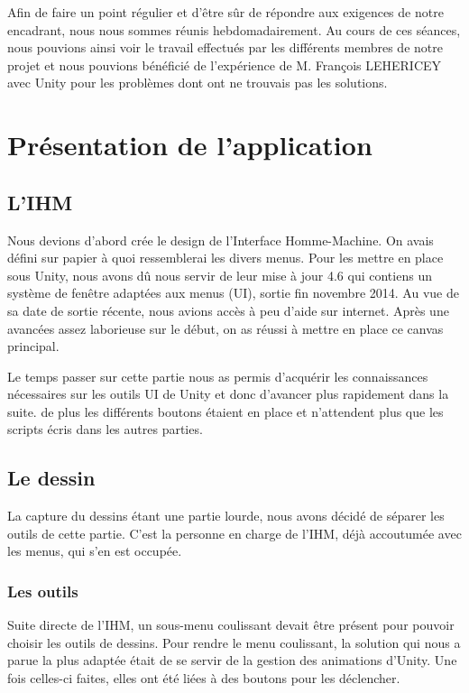 \documentclass[a4paper,11pt]{article}
\begin{document}
	Afin de faire un point régulier et d'être sûr de répondre aux exigences de notre encadrant, nous nous sommes réunis hebdomadairement. Au cours de ces séances, nous pouvions ainsi voir le travail effectués par les différents membres de notre projet et nous pouvions bénéficié de l'expérience de M. François LEHERICEY avec Unity pour les problèmes dont ont ne trouvais pas les solutions.
	\section{Présentation de l'application}
		\subsection{L'IHM}
			Nous devions d'abord crée le design de l'Interface Homme-Machine. On avais défini sur papier à quoi ressemblerai les divers menus. Pour les mettre en place sous Unity, nous avons dû nous servir de leur mise à jour 4.6 qui contiens un système de fenêtre adaptées aux menus (UI), sortie fin novembre 2014. Au vue de sa date de sortie récente, nous avions accès à peu d'aide sur internet. Après une avancées assez laborieuse sur le début, on as réussi à mettre en place ce canvas principal.
			
			Le temps passer sur cette partie nous as permis d'acquérir les connaissances nécessaires sur les outils UI de Unity et donc d'avancer plus rapidement dans la suite. de plus les différents boutons étaient en place et n'attendent plus que les scripts écris dans les autres parties.
		
		\subsection{Le dessin}
			La capture du dessins étant une partie lourde, nous avons décidé de séparer les outils de cette partie. C'est la personne en charge de l'IHM, déjà accoutumée avec les menus, qui s'en est occupée.
		
		
			\subsubsection{Les outils}
				Suite directe de l'IHM, un sous-menu coulissant devait être présent pour pouvoir choisir les outils de dessins. Pour rendre le menu coulissant, la solution qui nous a parue la plus adaptée était de se servir de la gestion des animations d'Unity. Une fois celles-ci faites, elles ont été liées à des boutons pour les déclencher. 
				
\end{document}
